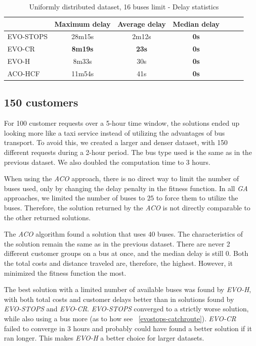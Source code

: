 \begin{table}
    \centering
    \begin{tabular}{lcccccc}
         &  Maximum delay & Average delay & Median delay \\
         \hline
         EVO-STOPS & 28m15s & 2m12s & \textbf{0s} \\
         EVO-CR & \textbf{8m19s} & \textbf{23s} & \textbf{0s} \\
         EVO-H & 8m33s & 30s & \textbf{0s} \\
         ACO-HCF & 11m54s & 41s & \textbf{0s} \\
    \end{tabular}
    \caption{Uniformly distributed dataset, 16 buses limit - Delay statistics}
    \label{tab:exp_random_16_delay_stats}
\end{table}

\clearpage

\subsection{150 customers}

For 100 customer requests over a 5-hour time window, the solutions ended up looking more like a taxi service instead of utilizing the advantages of bus transport. To avoid this, we created a larger and denser dataset, with 150 different requests during a 2-hour period. The bus type used is the same as in the previous dataset. We also doubled the computation time to 3 hours.

When using the \textit{ACO} approach, there is no direct way to limit the number of buses used, only by changing the delay penalty in the fitness function. In all \textit{GA} approaches, we limited the number of buses to $25$ to force them to utilize the buses. Therefore, the solution returned by the \textit{ACO} is not directly comparable to the other returned solutions.

The \textit{ACO} algorithm found a solution that uses $40$ buses. The characteristics of the solution remain the same as in the previous dataset. There are never 2 different customer groups on a bus at once, and the median delay is still 0. Both the total costs and distance traveled are, therefore, the highest. However, it minimized the fitness function the most. 

The best solution with a limited number of available buses was found by \textit{EVO-H}, with both total costs and customer delays better than in solutions found by \textit{EVO-STOPS} and \textit{EVO-CR}. \textit{EVO-STOPS} converged to a strictly worse solution, while also using a bus more (as to how see ~\ref{evostops-catchroute}). \textit{EVO-CR} failed to converge in 3 hours and probably could have found a better solution if it ran longer. This makes \textit{EVO-H} a better choice for larger datasets.

